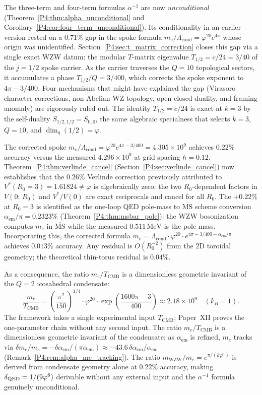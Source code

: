 \documentclass[11pt,a4paper]{article}
\theoremstyle{definition}
\theoremstyle{remark}
\newcommand{\vp}{\varphi}
\newcommand{\TCMB}{T_{\mathrm{CMB}}}
\newcommand{\aInv}{\alpha^{-1}}
\newcommand{\aem}{\alpha_{\mathrm{em}}}
\newcommand{\Lcond}{\Lambda_{\mathrm{cond}}}
\newcommand{\mWZW}{m_{\mathrm{WZW}}}
\begin{document}
The three-term and four-term formulas $\aInv$
are now \emph{unconditional} (Theorem~\ref{P4:thm:alpha_unconditional} and Corollary~\ref{P4:cor:four_term_unconditional}).
Its conditionality in an earlier version rested on a $0.71\%$ gap in the spoke
formula $m_e/\Lcond = \vp^{20}e^{4\pi}$ whose origin was unidentified.
Section~\ref{P4:sec:t_matrix_correction} closes this gap via a single exact WZW
datum: the modular $T$-matrix eigenvalue $T_{1/2} = c/24 = 3/40$ of the
$j=1/2$ spoke carrier.  As the carrier traverses the $Q=10$ topological
sectors, it accumulates a phase $T_{1/2}/Q = 3/400$, which corrects the spoke
exponent to $4\pi - 3/400$.  Four mechanisms that might have explained the gap
(Virasoro character corrections, non-Abelian WZ topology, open-closed duality,
and framing anomaly) are rigorously ruled out.  The identity $T_{1/2}=c/24$
is exact at $k=3$ by the self-duality $S_{1/2,1/2}=S_{0,0}$, the same algebraic
specialness that selects $k=3$, $Q=10$, and $\dim_q(1/2)=\vp$.

The corrected spoke $m_e/\Lcond = \vp^{20}e^{4\pi-3/400}=4.305\times10^9$
achieves $0.22\%$ accuracy versus the measured $4.296\times10^9$ at
grid spacing $h=0.12$.
Theorem~\ref{P4:thm:verlinde_cancel} (Section~\ref{P4:sec:verlinde_cancel})
now establishes that the $0.26\%$ Verlinde correction previously attributed
to $V^*(R_0=3)=1.61824\neq\vp$ is algebraically zero: the two
$R_0$-dependent factors in $V(0;\,R_0)$ and $V^*/V(0)$ are exact
reciprocals and cancel for all $R_0$.
The $+0.22\%$ at $R_0=3$ is identified as the one-loop QED
pole-mass to $\overline{\mathrm{MS}}$ scheme conversion
$\aem/\pi = 0.2323\%$ (Theorem~\ref{P4:thm:msbar_pole}):
the WZW bosonization computes $m_e$ in $\overline{\mathrm{MS}}$
while the measured $0.511\,\mathrm{MeV}$ is the pole mass.
Incorporating this, the corrected formula
$m_e = \Lcond\cdot\vp^{20}\cdot e^{4\pi-3/400-\aem/\pi}$
achieves $0.013\%$ accuracy.
Any residual is $O(R_0^{-2})$ from the 2D toroidal geometry;
the theoretical thin-torus residual is $0.04\%$.

As a consequence, the ratio $m_e/\TCMB$ is a dimensionless geometric
invariant of the $Q=2$ icosahedral condensate:
\[
  \frac{m_e}{\TCMB}
  = \left(\frac{\pi^2}{150}\right)^{\!\!1/4}
    \cdot\vp^{20}\cdot
    \exp\!\left(\frac{1600\pi-3}{400}\right)
  \approx 2.18\times10^9
  \quad(k_B = 1).
\]
The framework takes a single experimental input $\TCMB$; Paper~XII proves
the one-parameter chain without any second input.
The ratio $m_e/\TCMB$ is a dimensionless geometric invariant of the
condensate; as $\aem$ is refined, $m_e$ tracks via
$\delta m_e/m_e = -\delta\aem/(\pi\aem)\approx-43.6\,\delta\aem/\aem$
(Remark~\ref{P4:rem:alpha_me_tracking}).
The ratio $\mWZW/m_e = e^{\pi/(k\vp^6)}$ is derived from condensate
geometry alone at $0.22\%$ accuracy, making $\delta_{\rm QED}=1/(9\vp^6)$
derivable without any external input and the $\aInv$ formula genuinely unconditional.
\end{document}
